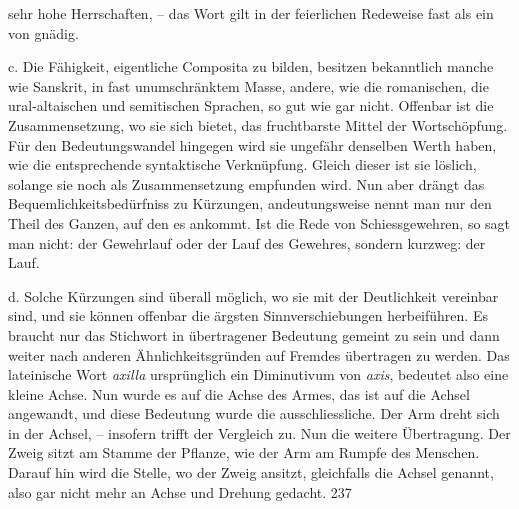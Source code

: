 {sehr hohe Herrschaften, – das Wort gilt in der feierlichen Redeweise fast als ein  von gnädig.

\label{III.II.II.12.2c}c. Die Fähigkeit, eigentliche Composita zu bilden, besitzen bekanntlich manche  wie Sanskrit, in fast unumschränktem Masse, andere, wie die romanischen, die ural-altaischen und semitischen Sprachen, so gut wie gar nicht. Offenbar ist die Zusammensetzung, wo sie sich bietet, das fruchtbarste Mittel der Wortschöpfung. Für den Bedeutungswandel hingegen wird sie ungefähr denselben Werth haben, wie die entsprechende syntaktische Verknüpfung. Gleich dieser ist sie löslich, solange sie noch als Zusammensetzung empfunden wird. Nun aber drängt das Bequemlichkeitsbedürfniss zu Kürzungen, andeutungsweise nennt man \label{fp.235} nur den Theil des Ganzen, auf den es ankommt. Ist die Rede von Schiessgewehren, so sagt man nicht: der Gewehrlauf oder der Lauf des Gewehres, sondern kurzweg: der Lauf.

\label{III.II.II.12.2d}d. Solche Kürzungen sind überall möglich, wo sie mit der Deutlichkeit vereinbar sind, und sie können offenbar die ärgsten Sinnverschiebungen herbeiführen. Es braucht nur das Stichwort in übertragener Bedeutung gemeint zu sein und dann weiter nach anderen Ähnlichkeitsgründen auf Fremdes übertragen zu werden. Das lateinische Wort \textit{axilla}  ursprünglich ein Diminutivum von \textit{axis}, bedeutet also eine kleine Achse. Nun wurde es auf die Achse des Armes, das ist auf die Achsel angewandt, und diese Bedeutung wurde die ausschliessliche. Der Arm dreht sich in der Achsel, – insofern trifft der Vergleich zu. Nun die weitere Übertragung. Der Zweig sitzt am Stamme der Pflanze, wie der Arm am Rumpfe des Menschen. Darauf hin wird die Stelle, wo der Zweig ansitzt, gleichfalls die Achsel genannt, also gar nicht mehr an Achse und Drehung gedacht.  {\textbar}{\textbar}237{\textbar}{\textbar}\label{sp.237} 

}
